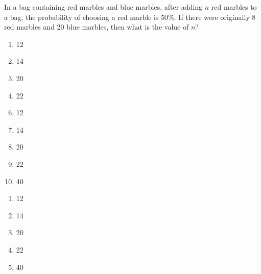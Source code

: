 



 In a bag containing red marbles and blue marbles, after adding $n$ red marbles to a bag, the probability of choosing a red marble is $50\%$.  If there were originally $8$ red marbles and 20 blue marbles, then what is the value of $n$?


\ifsat
	\begin{enumerate}[label=\Alph*)]
		\item   12%
		\item  14
		\item  20
		\item  22
	\end{enumerate}
\else
\fi

\ifacteven
	\begin{enumerate}[label=\textbf{\Alph*.},itemsep=\fill,align=left]
		\setcounter{enumii}{5}
		\item   12%
		\item  14
		\item  20
		\addtocounter{enumii}{1}
		\item  22
		\item  40
	\end{enumerate}
\else
\fi

\ifactodd
	\begin{enumerate}[label=\textbf{\Alph*.},itemsep=\fill,align=left]
		\item   12%
		\item  14
		\item  20
		\item  22
		\item  40
	\end{enumerate}
\else
\fi

%
		
\else
\fi

